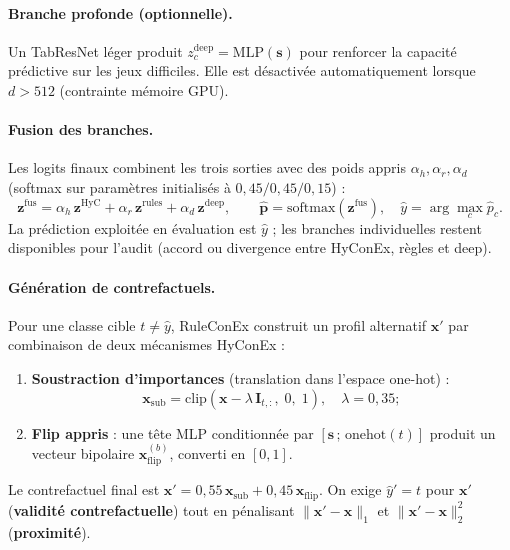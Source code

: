 \documentclass[12pt,a4paper]{article}
\begin{document}
\paragraph{Branche profonde (optionnelle).}
Un TabResNet l\'eger produit $z_c^{\mathrm{deep}}=\mathrm{MLP}(\bm{s})$ pour renforcer la capacit\'e pr\'edictive sur les jeux difficiles. Elle est d\'esactiv\'ee automatiquement lorsque $d>512$ (contrainte m\'emoire GPU).

\paragraph{Fusion des branches.}
Les logits finaux combinent les trois sorties avec des poids appris $\alpha_h,\alpha_r,\alpha_d$ (softmax sur param\`etres initialis\'es \`a $0{,}45/0{,}45/0{,}15$) :
\begin{equation}
\bm{z}^{\mathrm{fus}}=
\alpha_h\,\bm{z}^{\mathrm{HyC}}
+\alpha_r\,\bm{z}^{\mathrm{rules}}
+\alpha_d\,\bm{z}^{\mathrm{deep}},\qquad
\hat{\bm{p}}=\mathrm{softmax}(\bm{z}^{\mathrm{fus}}),\quad
\hat{y}=\arg\max_c \hat{p}_c.
\label{eq:fusion}
\end{equation}
La pr\'ediction exploit\'ee en \'evaluation est $\hat{y}$ ; les branches individuelles restent disponibles pour l'audit (accord ou divergence entre HyConEx, r\`egles et deep).

\paragraph{G\'en\'eration de contrefactuels.}
Pour une classe cible $t\neq\hat{y}$, RuleConEx construit un profil alternatif $\bm{x}'$ par combinaison de deux m\'ecanismes HyConEx :
\begin{enumerate}
  \item \textbf{Soustraction d'importances} (translation dans l'espace one-hot) :
  \[
  \bm{x}_{\mathrm{sub}}=\mathrm{clip}\!\left(\bm{x}-\lambda\,\bm{I}_{t,:},\;0,\;1\right),\quad \lambda=0{,}35 ;
  \]
  \item \textbf{Flip appris} : une t\^ete MLP conditionn\'ee par $[\bm{s}\,;\,\mathrm{onehot}(t)]$ produit un vecteur bipolaire $\bm{x}_{\mathrm{flip}}^{(b)}$, converti en $[0,1]$.
\end{enumerate}
Le contrefactuel final est $\bm{x}'=0{,}55\,\bm{x}_{\mathrm{sub}}+0{,}45\,\bm{x}_{\mathrm{flip}}$. On exige $\hat{y}'=t$ pour $\bm{x}'$ (\textbf{validit\'e contrefactuelle}) tout en p\'enalisant $\|\bm{x}'-\bm{x}\|_1$ et $\|\bm{x}'-\bm{x}\|_2^2$ (\textbf{proximit\'e}).
\end{document}
